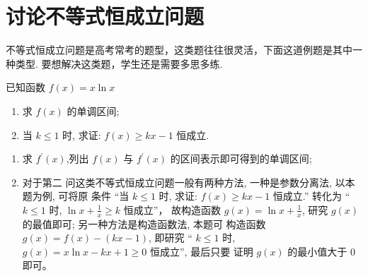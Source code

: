 \section{讨论不等式恒成立问题}

不等式恒成立问题是高考常考的题型，这类题往往很灵活，下面这道例题是其中一种类型. 要想解决这类题，学生还是需要多思多练.

\begin{example}
  \parencite{惠红民一题一课} 已知函数 ${f}({x})=x \ln x$
  \begin{enumerate}[(1)]
    \item 求 ${f}({x})$ 的单调区间;
    \item 当 $k \leq 1$ 时, 求证: $f(x) \geq k x-1$ 恒成立. 
  \end{enumerate}
\end{example}

\begin{analysis}
  \begin{enumerate}[(1)]
    \item 求 ${f}^{\prime}({x})$,列出 ${f}({x})$ 与 ${f}^{\prime}({x})$ 的区间表示即可得到的单调区间; 
    \item 对于第二 问这类不等式恒成立问题一般有两种方法, 一种是参数分离法, 以本题为例, 可将原 条件 “当 $k \leq 1$ 时, 求证: $f(x) \geq k x-1$ 恒成立.” 转化为 “ $k \leq 1$ 时, $\ln x+\frac{1}{x} \geq k$ 恒成立”， 故构造函数 $g(x)=\ln x+\frac{1}{x}$, 研究 ${g}({x})$ 的最值即可; 另一种方法是构造函数法, 本题可 构造函数 ${g}({x})={f}({x})-({kx}-1)$, 即研究 “ $k \leq 1$ 时, $g(x)=x \ln x-k x+1 \geq 0$ 恒成立”, 最后只要 证明 ${g}({x})$ 的最小值大于 0 即可。
  \end{enumerate}
\end{analysis}


